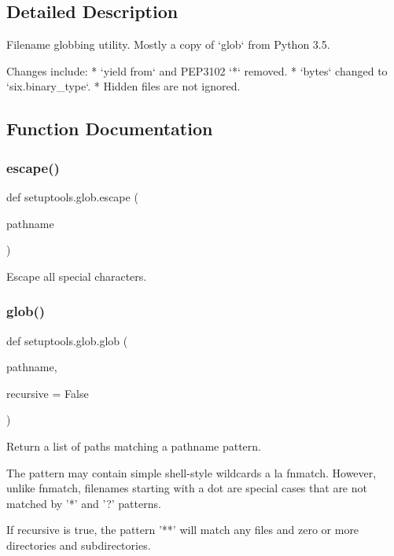 \subsection{Detailed Description}
\begin{DoxyVerb}Filename globbing utility. Mostly a copy of `glob` from Python 3.5.

Changes include:
 * `yield from` and PEP3102 `*` removed.
 * `bytes` changed to `six.binary_type`.
 * Hidden files are not ignored.
\end{DoxyVerb}
 

\subsection{Function Documentation}
\mbox{\label{namespacesetuptools_1_1glob_a73ffea4dfe02e8a0294dad20dbb55a0a}} 
\subsubsection{\texorpdfstring{escape()}{escape()}}
{\footnotesize\ttfamily def setuptools.\+glob.\+escape (\begin{DoxyParamCaption}\item[{}]{pathname }\end{DoxyParamCaption})}

\begin{DoxyVerb}Escape all special characters.
\end{DoxyVerb}
 \mbox{\label{namespacesetuptools_1_1glob_aaa3481017d8575f370da9768113e795f}} 
\subsubsection{\texorpdfstring{glob()}{glob()}}
{\footnotesize\ttfamily def setuptools.\+glob.\+glob (\begin{DoxyParamCaption}\item[{}]{pathname,  }\item[{}]{recursive = {\ttfamily False} }\end{DoxyParamCaption})}

\begin{DoxyVerb}Return a list of paths matching a pathname pattern.

The pattern may contain simple shell-style wildcards a la
fnmatch. However, unlike fnmatch, filenames starting with a
dot are special cases that are not matched by '*' and '?'
patterns.

If recursive is true, the pattern '**' will match any files and
zero or more directories and subdirectories.
\end{DoxyVerb}
 \mbox{\label{namespacesetuptools_1_1glob_a785709f6dd54bc19304bb581cc6e7707}} 
